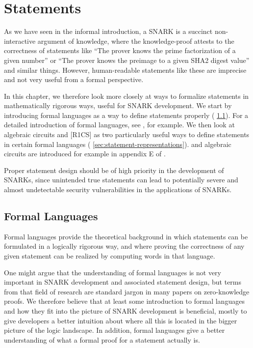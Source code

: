 \chapter{Statements}\label{sec:statements}\label{chap:statements}

As we have seen in the informal introduction, a SNARK is a succinct non-interactive argument of knowledge, where the knowledge-proof attests to the correctness of statements like ``The prover knows the prime factorization of a given number'' or ``The prover knows the preimage to a given SHA2 digest value'' and similar things. However,  human-readable statements like these are imprecise and not very useful from a formal perspective. 

In this chapter, we therefore look more closely at ways to formalize statements in mathematically rigorous ways, useful for SNARK development. We start by introducing formal languages as a way to define statements properly (\secname{} \ref{sec:formal-languages}). For a detailed introduction of formal languages, see \cite{moll-2012}, for example. We then look at algebraic circuits and  [R1CS] as two particularly useful ways to define statements in certain formal languages (\secname{} \ref{sec:statement-representations}).  and algebraic circuits are introduced for example in appendix E of \cite{sasson-2013}.

Proper statement design should be of high priority in the development of SNARKs, since unintended true statements can lead to potentially severe and almost undetectable security vulnerabilities in the applications of SNARKs.

\section{Formal Languages}\label{sec:formal-languages}

Formal languages provide the theoretical background in which statements can be formulated in a logically rigorous way, and where proving the correctness of any given statement can be realized by computing words in that language.

One might argue that the understanding of formal languages is not very important in SNARK development and associated statement design, but terms from that field of research are standard jargon in many papers on zero-knowledge proofs. We therefore believe that at least some introduction to formal languages and how they fit into the picture of SNARK development is beneficial, mostly to give developers a better intuition about where all this is located in the bigger picture of the logic landscape. In addition, formal languages give a better understanding of what a formal proof for a statement actually is.


